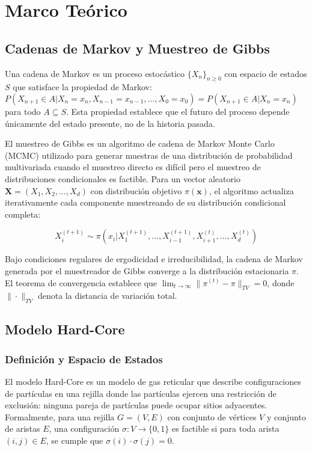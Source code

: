 \section{Marco Teórico}

\subsection{Cadenas de Markov y Muestreo de Gibbs}

Una cadena de Markov es un proceso estocástico $\{X_n\}_{n \geq 0}$ con espacio de estados $S$ que satisface la propiedad de Markov: $P(X_{n+1} \in A | X_n = x_n, X_{n-1} = x_{n-1}, \ldots, X_0 = x_0) = P(X_{n+1} \in A | X_n = x_n)$ para todo $A \subseteq S$. Esta propiedad establece que el futuro del proceso depende únicamente del estado presente, no de la historia pasada.

El muestreo de Gibbs es un algoritmo de cadena de Markov Monte Carlo (MCMC) utilizado para generar muestras de una distribución de probabilidad multivariada cuando el muestreo directo es difícil pero el muestreo de distribuciones condicionales es factible. Para un vector aleatorio $\mathbf{X} = (X_1, X_2, \ldots, X_d)$ con distribución objetivo $\pi(\mathbf{x})$, el algoritmo actualiza iterativamente cada componente muestreando de su distribución condicional completa:

\begin{equation}
X_i^{(t+1)} \sim \pi(x_i | X_1^{(t+1)}, \ldots, X_{i-1}^{(t+1)}, X_{i+1}^{(t)}, \ldots, X_d^{(t)})
\end{equation}

Bajo condiciones regulares de ergodicidad e irreducibilidad, la cadena de Markov generada por el muestreador de Gibbs converge a la distribución estacionaria $\pi$. El teorema de convergencia establece que $\lim_{t \to \infty} \|\pi^{(t)} - \pi\|_{TV} = 0$, donde $\|\cdot\|_{TV}$ denota la distancia de variación total.

\subsection{Modelo Hard-Core}

\subsubsection{Definición y Espacio de Estados}

El modelo Hard-Core es un modelo de gas reticular que describe configuraciones de partículas en una rejilla donde las partículas ejercen una restricción de exclusión: ninguna pareja de partículas puede ocupar sitios adyacentes. Formalmente, para una rejilla $G = (V, E)$ con conjunto de vértices $V$ y conjunto de aristas $E$, una configuración $\sigma: V \to \{0, 1\}$ es factible si para toda arista $(i,j) \in E$, se cumple que $\sigma(i) \cdot \sigma(j) = 0$.

